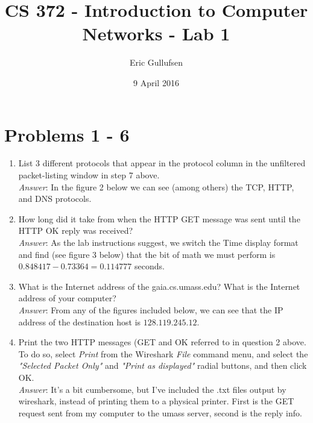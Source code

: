 \documentclass[12pt]{article}
\begin{document}
\title{CS 372 - Introduction to Computer Networks - Lab 1}
\author{Eric Gullufsen}
\date{9 April 2016}
\maketitle

\section{Problems 1 - 6}
\begin{enumerate}

\item
List 3 different protocols that appear in the protocol column in the unfiltered packet-listing 
window in step 7 above.\\
\textit{Answer}: In the figure 2 below we can see (among others) the TCP, HTTP, and DNS protocols.

\item
How long did it take from when the HTTP GET message was sent until the HTTP OK reply
was received?\\
\textit{Answer}: As the lab instructions suggest, we switch the Time display format
and find (see figure 3 below) that the bit of math we must perform is 
$0.848417 - 0.73364 = 0.114777$ seconds.

\item
What is the Internet address of the gaia.cs.umass.edu?
What is the Internet address of your computer?\\
\textit{Answer}: From any of the figures included below, we can see that
the IP address of the destination host is $128.119.245.12$.

\item
Print the two HTTP messages (GET and OK referred to in question 2 above.
To do so, select \textit{Print} from the Wireshark \textit{File} command menu,
and select the \textit{"Selected Packet Only"} and \textit{"Print as displayed"}
radial buttons, and then click OK.\\
\textit{Answer}: It's a bit cumbersome, but I've included the .txt files output
by wireshark, instead of printing them to a physical printer. First is the GET
request sent from my computer to the umass server, second is the reply info.\\

\tiny

\normalsize

\tiny

\normalsize


\end{enumerate}
\end{document}
